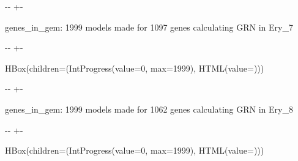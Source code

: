 \documentclass[letterpaper,10pt,english]{sphinxmanual}
\newlength\nbsphinxcodecellspacing
\begin{document}
%
{
\kern-\sphinxverbatimsmallskipamount\kern-\baselineskip
\kern+\FrameHeightAdjust\kern-\fboxrule
\vspace{\nbsphinxcodecellspacing}
%
\begin{sphinxVerbatim}[commandchars=\\\{\}]

genes\_in\_gem: 1999
models made for 1097 genes
calculating GRN in Ery\_7
\end{sphinxVerbatim}
}
\relax

{

\kern-\sphinxverbatimsmallskipamount\kern-\baselineskip
\kern+\FrameHeightAdjust\kern-\fboxrule
\vspace{\nbsphinxcodecellspacing}

%
\begin{sphinxVerbatim}[commandchars=\\\{\}]
HBox(children=(IntProgress(value=0, max=1999), HTML(value=\PYGZsq{}\PYGZsq{})))
\end{sphinxVerbatim}
}



%
{
\kern-\sphinxverbatimsmallskipamount\kern-\baselineskip
\kern+\FrameHeightAdjust\kern-\fboxrule
\vspace{\nbsphinxcodecellspacing}
%
\begin{sphinxVerbatim}[commandchars=\\\{\}]

genes\_in\_gem: 1999
models made for 1062 genes
calculating GRN in Ery\_8
\end{sphinxVerbatim}
}
\relax

{

\kern-\sphinxverbatimsmallskipamount\kern-\baselineskip
\kern+\FrameHeightAdjust\kern-\fboxrule
\vspace{\nbsphinxcodecellspacing}

%
\begin{sphinxVerbatim}[commandchars=\\\{\}]
HBox(children=(IntProgress(value=0, max=1999), HTML(value=\PYGZsq{}\PYGZsq{})))
\end{sphinxVerbatim}
}
\end{document}

